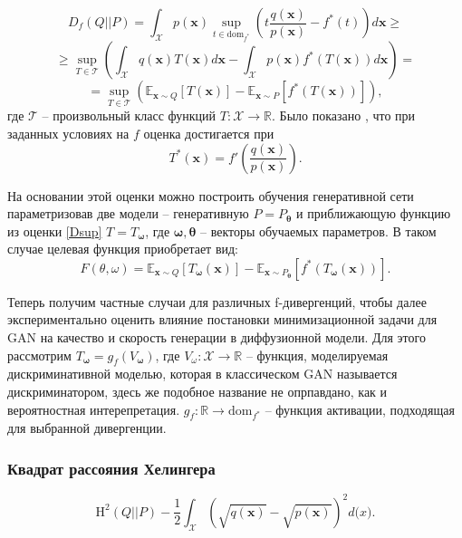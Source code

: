 \documentclass{article}
\begin{document}
\begin{equation}
	D_f(Q||P) = \int_\mathcal{X} p(\mathbf{x})  
	\sup\limits_{t\in \text{dom}_{f^*}} \left( t\frac{q(\mathbf{x})}{p(\mathbf{x})}-f^*(t) \right) d\mathbf{x}
	\geqslant
\end{equation}
\begin{equation}
		\geqslant\sup\limits_{T \in \mathcal{T}}\left(\int _\mathcal{X}q(\mathbf{x})T(\mathbf{x})d\mathbf{x} -  \int _\mathcal{X}p(\mathbf{x})f^*(T(\mathbf{x}))d\mathbf{x} \right) = 
\end{equation}
\begin{equation}
	= \sup\limits_{T \in \mathcal{T}}\left(\mathbb{E}_{\mathbf{x}\sim Q} [T(\mathbf{x})] - \mathbb{E}_{\mathbf{\mathbf{x}}\sim P} [f^*(T(\mathbf{x}))] \right),
		\label{Dsup} 
\end{equation}
где $\mathcal{T}$ -- произвольный класс функций $T:\mathcal{X} \to \mathbb{R}$. Было показано \cite{Nguyen_2010}, что при заданных условиях на $f$ оценка достигается при 
\begin{equation}
	T^*(\mathbf{x}) = f'\left(\frac{q(\mathbf{x})}{p(\mathbf{x})}\right).
\end{equation}

На основании этой оценки можно построить обучения генеративной сети параметризовав две модели -- генеративную $P = P_\mathbf{\theta}$ и приближающую функцию из оценки \ref{Dsup} $T = T_\mathbf{\omega}$, где $\mathbf{\omega}, \mathbf{\theta}$ -- векторы обучаемых параметров. В таком случае целевая функция приобретает вид:
\begin{equation}
F(\theta, \omega) = \mathbb{E}_{\mathbf{x}\sim Q} [T_\mathbf{\omega}(\mathbf{x})] - \mathbb{E}_{ \mathbf{\mathbf{x}}\sim P_\mathbf{\theta}}[f^*(T_\mathbf{\omega}(\mathbf{x}))].
\end{equation}

Теперь получим частные случаи для различных f-дивергенций, чтобы далее экспериментально оценить влияние постановки минимизационной задачи для GAN на качество и скорость генерации в диффузионной модели.
Для этого рассмотрим $T_\mathbf{\omega} = g_f(V_\mathbf{\omega})$, где $V_\omega : \mathcal{X} \to \mathbb{R}$ -- функция, моделируемая дискриминативной моделью, которая в классическом GAN называется дискриминатором, здесь же подобное название не опрпавдано, как и вероятностная интерепретация. $g_f: \mathbb{R} \to \text{dom}_{f^*}$ -- функция активации, подходящая для выбранной дивергенции.

\subsubsection{Квадрат рассояния Хелингера}
\begin{equation}
	\text{H}^2(Q||P) - \frac{1}{2}\int_\mathcal{X} \left(\sqrt{q(\mathbf{x})} - \sqrt{p(\mathbf{x})}\right)^2d\mathbf(x).
\end{equation}
\end{document}
